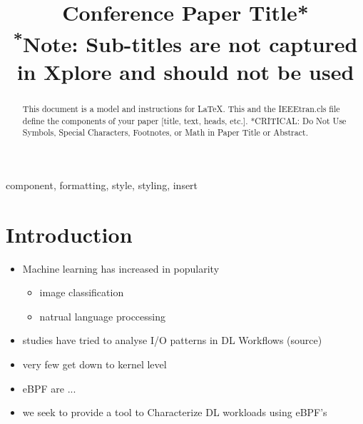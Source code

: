 \documentclass[conference]{IEEEtran}
\begin{document}
\title{Conference Paper Title*\\
{\footnotesize \textsuperscript{*}Note: Sub-titles are not captured in Xplore and
should not be used}
}

\author{
    \and
    \and
}

\maketitle

\begin{abstract}
    This document is a model and instructions for \LaTeX.
    This and the IEEEtran.cls file define the components of your paper [title, text, heads, etc.]. *CRITICAL: Do Not Use Symbols, Special Characters, Footnotes,
    or Math in Paper Title or Abstract.
\end{abstract}

\begin{IEEEkeywords}
    component, formatting, style, styling, insert
\end{IEEEkeywords}

\section{Introduction}
\begin{itemize}
    \item Machine learning has increased in popularity
    \begin{itemize}
        \item image classification
        \item natrual language proccessing
    \end{itemize}
    \item studies have tried to analyse I/O patterns in DL Workflows (source)
    \item very few get down to kernel level
    \item eBPF are ...
    \item we seek to provide a tool to Characterize DL workloads using eBPF's
\end{itemize}
\end{document}

